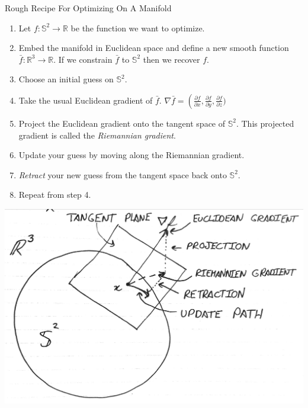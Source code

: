 \documentclass[presentation]{beamer}
\begin{document}
\begin{frame}[label=sec-7]{Rough Recipe For Optimizing On A Manifold}
\begin{enumerate}
\item Let $f:\mathbb{S}^2 \rightarrow \mathbb{R}$ be the function we want to optimize. 
\item {Embed the manifold in Euclidean space and define a new smooth function $\bar{f}: \mathbb{R}^3 \rightarrow \mathbb{R}$. If we 
constrain $\bar{f}$ to $\mathbb{S}^2$ then we recover $f$.}
\item Choose an initial guess on $\mathbb{S}^2$. 
\item Take the usual Euclidean gradient of $\bar{f}$. $\nabla \bar{f} = \left(\frac{\partial f}{\partial x}, \frac{\partial f}{\partial y}, \frac{\partial f}{\partial z})$
\item Project the Euclidean gradient onto the tangent space of $\mathbb{S}^2$. This projected gradient is called the \textit{Riemannian gradient}. 
\item Update your guess by moving along the Riemannian gradient. 
\item \textit{Retract} your new guess from the tangent space back onto $\mathbb{S}^2$. 
\item Repeat from step 4.
\end{enumerate}
\end{frame}
\begin{frame}[label=sec-8]{}
\begin{center}
  \includegraphics[width=1.0\textwidth, interpolate=true]{figs/tangent.pdf}\\
\end{center}
\end{frame}
\end{document}
